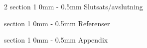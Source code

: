 \documentclass[a4paper]{article}
\makeatletter
\renewcommand{\section}{\@startsection
{section}%
{1}%
{0mm}%
{-\baselineskip}%
{0.5mm}%
{\normalfont\bfseries}} %
\makeatother
\begin{document}
\begin{multicols}{2}
  \section{Slutsats/avslutning}

  \section{Referenser}

  \section{Appendix}

\end{multicols}
\end{document}
